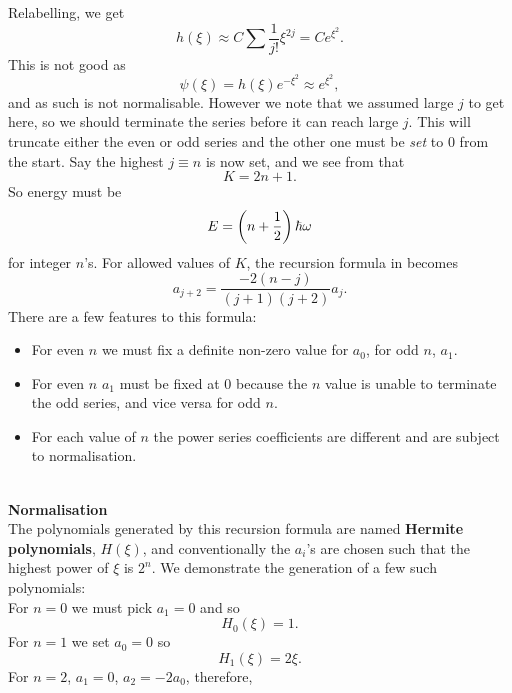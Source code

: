 Relabelling, we get
\begin{equation}
h(\xi)\approx C\sum\frac{1}{j!}\xi^{2j}=Ce^{\xi^2}.
\end{equation}
This is not good as 
\begin{equation}
\psi(\xi)=h(\xi)e^{-\xi^2}\approx e^{\xi^2},
\end{equation}
and as such is not normalisable. However we note that we assumed large $j$ to get here, so we should terminate the series before it can reach large $j$. 
This will truncate either the even or odd series and the other one must be \textit{set} to $0$ from the start. 
Say the highest $j\equiv n$ is now set, and we see from  that 
\begin{equation}
K=2n+1.
\end{equation}
So energy must be 
\begin{equation}
E=\left(n+\frac{1}{2} \right)\hbar\omega
\end{equation}
for integer $n$'s. For allowed values of $K$, the recursion formula in  becomes 
\begin{equation}
a_{j+2}=\frac{-2(n-j)}{(j+1)(j+2)}a_j.
\end{equation}
There are a few features to this formula: 
\begin{itemize}
	\item For even $n$ we must fix a definite non-zero value for $a_0$, for odd $n$, $a_1$.
	\item For even $n$ $a_1$ must be fixed at $0$ because the $n$ value is unable to terminate the odd series, and vice versa for odd $n$.
	\item For each value of $n$ the power series coefficients are different and are subject to normalisation. 
\end{itemize}
\ \\
\textbf{Normalisation}\\
The polynomials generated by this recursion formula are named \textbf{Hermite polynomials}, $H(\xi)$, 
and conventionally the $a_i$'s are chosen such that the highest power of $\xi$ is $2^n$. We demonstrate the generation of a few such polynomials: \\
For $n=0$ we must pick $a_1=0$ and so
\begin{equation}
H_0(\xi)=1.
\end{equation}
For $n=1$ we set $a_0=0$ so
\begin{equation}
H_1(\xi)=2\xi.
\end{equation}
For $n=2$, $a_1=0$, $a_2=-2a_0$, therefore, 
